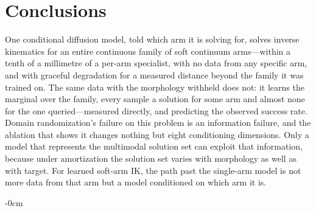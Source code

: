 \documentclass[robotics,article,submit,moreauthors]{Definitions/mdpi}
\begin{document}
\section{Conclusions}

One conditional diffusion model, told which arm it is solving for,
solves inverse kinematics for an entire continuous family of soft
continuum arms---within a tenth of a millimetre of a per-arm specialist,
with no data from any specific arm, and with graceful degradation for a
measured distance beyond the family it was trained on. The same data with the morphology
withheld does not: it learns the marginal over the family, every sample
a solution for some arm and almost none for the one queried---measured
directly, and predicting the observed success rate. Domain randomization's
failure on this problem is an information failure, and the ablation that
shows it changes nothing but eight conditioning dimensions. Only a
model that represents the multimodal solution set can exploit that
information, because under amortization the solution set varies with
morphology as well as with target. For
learned soft-arm IK, the path past the single-arm model is not more data
from that arm but a model conditioned on which arm it is.

\vspace{6pt}




\begin{adjustwidth}{-\extralength}{0cm}

\PublishersNote{}
\end{adjustwidth}
\end{document}
